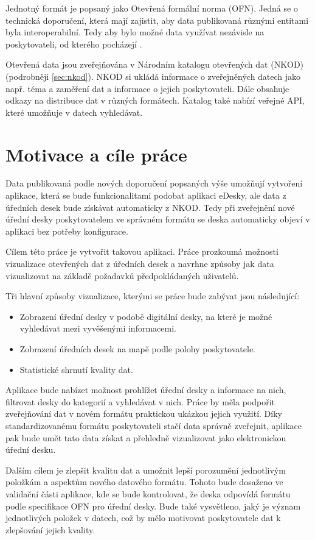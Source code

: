 Jednotný formát je popsaný jako Otevřená formální norma (OFN). Jedná se o technická doporučení, která mají zajistit, aby data publikovaná různými entitami byla interoperabilní. Tedy aby bylo možné data využívat nezávisle na poskytovateli, od kterého pocházejí \cite{OFN}. 

Otevřená data jsou zveřejňována v Národním katalogu otevřených dat (NKOD) (podrobněji \autoref{sec:nkod}). NKOD si ukládá informace o zveřejněných datech jako např. téma a zaměření dat a informace o jejich poskytovateli. Dále obsahuje odkazy na distribuce dat v různých formátech. Katalog také nabízí veřejné API, které umožňuje v datech vyhledávat. 

\section*{Motivace a cíle práce}

Data publikovaná podle nových doporučení popsaných výše umožňují vytvoření aplikace, která se bude funkcionalitami podobat aplikaci eDesky, ale data z úředních desek bude získávat automaticky z NKOD. Tedy při zveřejnění nové úřední desky poskytovatelem ve správném formátu se deska automaticky objeví v aplikaci bez potřeby konfigurace.

Cílem této práce je vytvořit takovou aplikaci. Práce prozkoumá možnosti vizualizace otevřených dat z úředních desek a navrhne způsoby jak data vizualizovat na základě požadavků předpokládaných uživatelů. 

Tři hlavní způsoby vizualizace, kterými se práce bude zabývat jsou následující:
\begin{itemize}
    \item Zobrazení úřední desky v podobě digitální desky, na které je možné vyhledávat mezi vyvěšenými informacemi.
    \item Zobrazení úředních desek na mapě podle polohy poskytovatele.
    \item Statistické shrnutí kvality dat.
\end{itemize}

Aplikace bude nabízet možnost prohlížet úřední desky a informace na nich, filtrovat desky do kategorií a vyhledávat v nich. Práce by měla podpořit zveřejňování dat v novém formátu praktickou ukázkou jejich využití. Díky standardizovanému formátu poskytovateli stačí data správně zveřejnit, aplikace pak bude umět tato data získat a přehledně vizualizovat jako elektronickou úřední desku.

Dalším cílem je zlepšit kvalitu dat a umožnit lepší porozumění jednotlivým položkám a aspektům nového datového formátu. Tohoto bude dosaženo ve validační části aplikace, kde se bude kontrolovat, že deska odpovídá formátu podle specifikace OFN pro úřední desky. Bude také vysvětleno, jaký je význam jednotlivých položek v datech, což by mělo motivovat poskytovatele dat k zlepšování jejich kvality.


